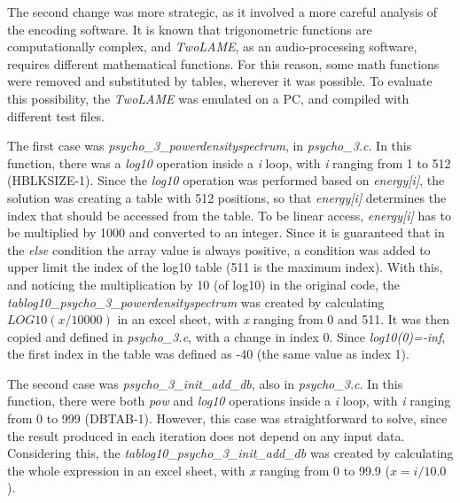 The second change was more strategic, as it involved a more careful analysis of the encoding software. It is known that trigonometric functions are computationally complex, and \textit{TwoLAME}, as an audio-processing software, requires different mathematical functions. For this reason, some math functions were removed and substituted by tables, wherever it was possible. To evaluate this possibility, the \textit{TwoLAME} was emulated on a PC, and compiled with different test files.

The first case was \textit{psycho\_3\_powerdensityspectrum}, in \textit{psycho\_3.c}. In this function, there was a \textit{log10} operation inside a \textit{i} loop, with \textit{i} ranging from 1 to 512 (HBLKSIZE-1). Since the \textit{log10} operation was performed based on \textit{energy[i]}, the solution was creating a table with 512 positions, so that \textit{energy[i]} determines the index that should be accessed from the table. To be linear access, \textit{energy[i]} has to be multiplied by 1000 and converted to an integer. Since it is guaranteed that in the \textit{else} condition the array value is always positive, a condition was added to upper limit the index of the log10 table (511 is the maximum index). With this, and noticing the multiplication by 10 (of log10) in the original code, the \textit{tablog10\_psycho\_3\_powerdensityspectrum} was created by calculating $LOG10(x/10000)$ in an excel sheet, with \textit{x} ranging from 0 and 511. It was then copied and defined in \textit{psycho\_3.c}, with a change in index 0. Since \textit{log10(0)=-inf}, the first index in the table was defined as -40 (the same value as index 1).

\begin{comment}
\begin{figure}[H]
\centerline{\fbox{\texttt{[image: powerdensityspectrum.pdf]}}}
\caption{\textit{psycho\_3\_powerdensityspectrum} function.}
\label{powerdensityspectrum}
\end{figure}
\end{comment}


The second case was \textit{psycho\_3\_init\_add\_db}, also in \textit{psycho\_3.c}. In this function, there were both \textit{pow} and \textit{log10} operations inside a \textit{i} loop, with \textit{i} ranging from 0 to 999 (DBTAB-1). However, this case was straightforward to solve, since the result produced in each iteration does not depend on any input data. Considering this, the \textit{tablog10\_psycho\_3\_init\_add\_db} was created by calculating the whole expression in an excel sheet, with \textit{x} ranging from 0 to 99.9 ($x=i/10.0$).

